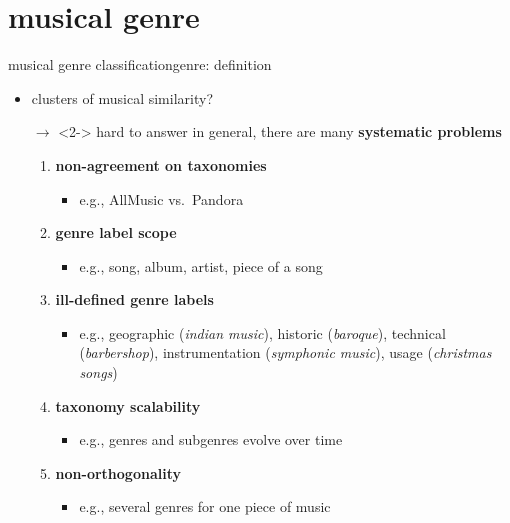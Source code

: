    \section[genre]{musical genre}
        \begin{frame}{musical genre classification}{genre: definition}

            \bigskip
            \begin{itemize}
                \item   clusters of musical similarity?
                \item[$\rightarrow$]<2->             hard to answer in general, there are many \textbf{systematic problems}
                \smallskip
                    \begin{enumerate}
                        \item<3->	\textbf{non-agreement on taxonomies}
                            \begin{itemize}
                                \item   e.g., AllMusic vs.\ Pandora
                            \end{itemize}
                        \item<3->   \textbf{genre label scope}
                            \begin{itemize}
                                \item   e.g., song, album, artist, piece of a song
                            \end{itemize}
                        \item<3->	\textbf{ill-defined genre labels}
                            \begin{itemize}
                                \item   e.g., geographic (\textit{indian music}), historic (\textit{baroque}), technical (\textit{barbershop}), instrumentation (\textit{symphonic music}), usage (\textit{christmas songs})
                            \end{itemize}
                        \item<3->	\textbf{taxonomy scalability}
                            \begin{itemize}
                                \item   e.g., genres and subgenres evolve over time
                            \end{itemize}
                        \item<3->	\textbf{non-orthogonality} 
                            \begin{itemize}
                                \item   e.g., several genres for one piece of music
                            \end{itemize}
                    \end{enumerate}

            \end{itemize}
            
        \end{frame}
